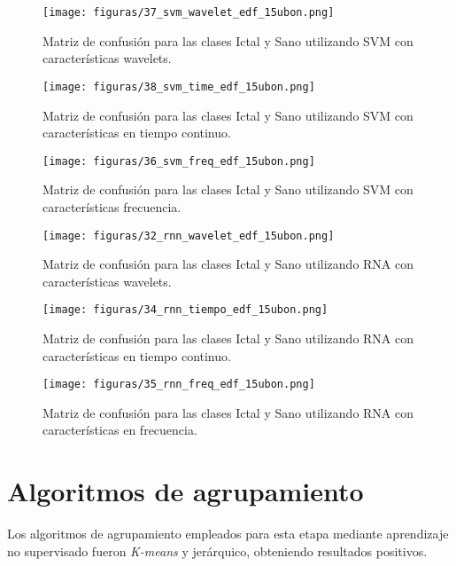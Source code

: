 \begin{figure}[H]
    \centering
    \texttt{[image: figuras/37\_svm\_wavelet\_edf\_15ubon.png]}
    \caption{Matriz de confusión para las clases Ictal y Sano utilizando SVM con características wavelets.}
    \label{fig: Matriz confusion svm wavelets}
\end{figure}
\begin{figure}[H]
    \centering
    \texttt{[image: figuras/38\_svm\_time\_edf\_15ubon.png]}
    \caption{Matriz de confusión para las clases Ictal y Sano utilizando SVM con características en tiempo continuo.}
    \label{fig: Matriz confusion svm time}
\end{figure}
\begin{figure}[H]
    \centering
    \texttt{[image: figuras/36\_svm\_freq\_edf\_15ubon.png]}
    \caption{Matriz de confusión para las clases Ictal y Sano utilizando SVM con características frecuencia.}
    \label{fig: Matriz confusion svm freq}
\end{figure}

\begin{figure}[H]
    \centering
    \texttt{[image: figuras/32\_rnn\_wavelet\_edf\_15ubon.png]}
    \caption{Matriz de confusión para las clases Ictal y Sano utilizando RNA con características wavelets.}
    \label{fig: Matriz confusion RNA wavelet}
\end{figure}
\begin{figure}[H]
    \centering
    \texttt{[image: figuras/34\_rnn\_tiempo\_edf\_15ubon.png]}
    \caption{Matriz de confusión para las clases Ictal y Sano utilizando RNA con características en tiempo continuo.}
    \label{fig: Matriz confusion RNA tiempo}
\end{figure}
\begin{figure}[H]
    \centering
    \texttt{[image: figuras/35\_rnn\_freq\_edf\_15ubon.png]}
    \caption{Matriz de confusión para las clases Ictal y Sano utilizando RNA con características en frecuencia.}
    \label{fig: Matriz confusion RNA freq}
\end{figure}

\section{Algoritmos de agrupamiento}
Los algoritmos de agrupamiento empleados para esta etapa mediante aprendizaje no supervisado fueron \textit{K-means} y jerárquico, obteniendo resultados positivos. 

